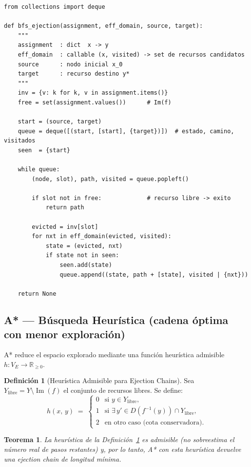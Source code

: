 \documentclass[12pt, a4paper]{article}
\theoremstyle{definition}
\newtheorem{definition}{Definición}[section]
\theoremstyle{plain}
\newtheorem{theorem}{Teorema}[section]
\theoremstyle{remark}
\newcommand{\dom}[1]{D\!\left(#1\right)}
\newcommand{\inv}[1]{f^{-1}\!\left(#1\right)}
\begin{document}
\begin{lstlisting}[caption={Implementación BFS en Python}]
from collections import deque

def bfs_ejection(assignment, eff_domain, source, target):
    """
    assignment  : dict  x -> y
    eff_domain  : callable (x, visited) -> set de recursos candidatos
    source      : nodo inicial x_0
    target      : recurso destino y*
    """
    inv = {v: k for k, v in assignment.items()}
    free = set(assignment.values())      # Im(f)

    start = (source, target)
    queue = deque([(start, [start], {target})])  # estado, camino, visitados
    seen  = {start}

    while queue:
        (node, slot), path, visited = queue.popleft()

        if slot not in free:             # recurso libre -> exito
            return path

        evicted = inv[slot]
        for nxt in eff_domain(evicted, visited):
            state = (evicted, nxt)
            if state not in seen:
                seen.add(state)
                queue.append((state, path + [state], visited | {nxt}))

    return None
\end{lstlisting}

\subsection{A* — Búsqueda Heurística (cadena óptima con menor exploración)}

A* reduce el espacio explorado mediante una función heurística admisible
$h: V_E \to \mathbb{R}_{\geq 0}$.

\begin{definition}[Heurística Admisible para Ejection Chains]
  \label{def:heuristic}
  Sea $Y_{\text{libre}} = Y \setminus \operatorname{Im}(f)$ el conjunto de
  recursos libres.  Se define:
  \[
    h(x,\, y) \;=\;
    \begin{cases}
      0 & \text{si } y \in Y_{\text{libre}},\\[3pt]
      1 & \text{si } \exists\, y' \in \dom{\inv{y}} \cap Y_{\text{libre}},\\[3pt]
      2 & \text{en otro caso (cota conservadora).}
    \end{cases}
  \]
\end{definition}

\begin{theorem}
  La heurística de la Definición~\ref{def:heuristic} es \emph{admisible}
  (no sobreestima el número real de pasos restantes) y, por lo tanto,
  A* con esta heurística devuelve una ejection chain de longitud mínima.
\end{theorem}
\end{document}
